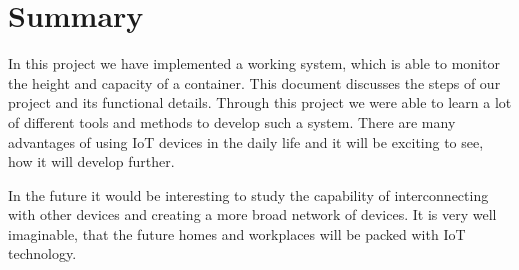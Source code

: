 \documentclass{article}
\begin{document}
\section{Summary}
In this project we have implemented a working system, which is able to monitor the height and capacity of a container. This document discusses the steps of our project and its functional details. Through this project we were able to learn a lot of different tools and methods to develop such a system. There are many advantages of using IoT devices in the daily life and it will be exciting to see, how it will develop further.

In the future it would be interesting to study the capability of interconnecting with other
devices and creating a more broad network of devices. It is very well imaginable, that the future homes and workplaces will be packed with IoT technology.
\end{document}
